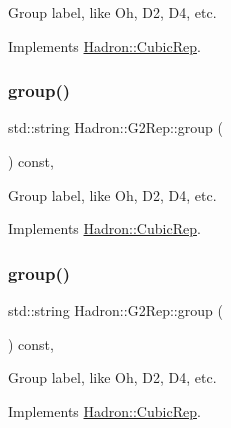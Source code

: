 Group label, like Oh, D2, D4, etc. 

Implements \mbox{\hyperlink{structHadron_1_1CubicRep_a0748f11ec87f387062c8e8981339a29c}{Hadron\+::\+Cubic\+Rep}}.

\mbox{\label{structHadron_1_1G2Rep_a6314a9f6f255a4916e007936876f6135}} 
\subsubsection{\texorpdfstring{group()}{group()}\hspace{0.1cm}{\footnotesize\ttfamily [2/3]}}
{\footnotesize\ttfamily std\+::string Hadron\+::\+G2\+Rep\+::group (\begin{DoxyParamCaption}{ }\end{DoxyParamCaption}) const\hspace{0.3cm}{\ttfamily [inline]}, {\ttfamily [virtual]}}

Group label, like Oh, D2, D4, etc. 

Implements \mbox{\hyperlink{structHadron_1_1CubicRep_a0748f11ec87f387062c8e8981339a29c}{Hadron\+::\+Cubic\+Rep}}.

\mbox{\label{structHadron_1_1G2Rep_a6314a9f6f255a4916e007936876f6135}} 
\subsubsection{\texorpdfstring{group()}{group()}\hspace{0.1cm}{\footnotesize\ttfamily [3/3]}}
{\footnotesize\ttfamily std\+::string Hadron\+::\+G2\+Rep\+::group (\begin{DoxyParamCaption}{ }\end{DoxyParamCaption}) const\hspace{0.3cm}{\ttfamily [inline]}, {\ttfamily [virtual]}}

Group label, like Oh, D2, D4, etc. 

Implements \mbox{\hyperlink{structHadron_1_1CubicRep_a0748f11ec87f387062c8e8981339a29c}{Hadron\+::\+Cubic\+Rep}}.

\mbox{\label{structHadron_1_1G2Rep_aa186588eb9d24c8e3ecad3496a16225a}} 
